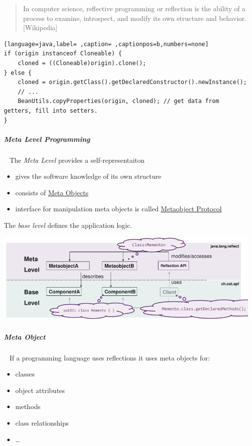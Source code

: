 \documentclass[11pt,twoside,landscape]{article}
\begin{document}
\begin{multicols}{3}
\begin{quote}
In computer science, reflective programming or reflection is the ability of a process to examine, introspect, and modify its own structure and behavior. [Wikipedia]
\end{quote}


\begin{lstlisting}[language=java,label= ,caption= ,captionpos=b,numbers=none]
if (origin instanceof Cloneable) {
    cloned = ((Cloneable)origin).clone();
} else {
    cloned = origin.getClass().getDeclaredConstructor().newInstance();
    // ...
    BeanUtils.copyProperties(origin, cloned); // get data from getters, fill into setters.
}
\end{lstlisting}
\subparagraph{Meta Level Programming} \
\label{sec:org0e94475}
The \emph{Meta Level} provides a self-representaiton
\begin{itemize}
\item gives the software knowledge of its own structure
\item consists of \href{../../../roam/20230115160536-what_are_meta_objects.org}{Meta Objects}
\item interface for manipulation meta objects is called \href{../../../roam/20230115160651-what_is_the_metaobject_protocol.org}{Metaobject Protocol}
\end{itemize}


The \emph{base level} defines the application logic.

{
\begin{center}
\includegraphics[width=.9\linewidth]{img/meta_base_level.png}
\end{center}
\label{fig:meta-level-and-base-level}
}
\subparagraph{Meta Object} \
\label{sec:org9188e67}
If a programming language uses reflections it uses meta objects for:
\begin{itemize}
\item classes
\item object attributes
\item methods
\item class relationships
\item \ldots{}
\end{itemize}



\end{multicols}
\end{document}
